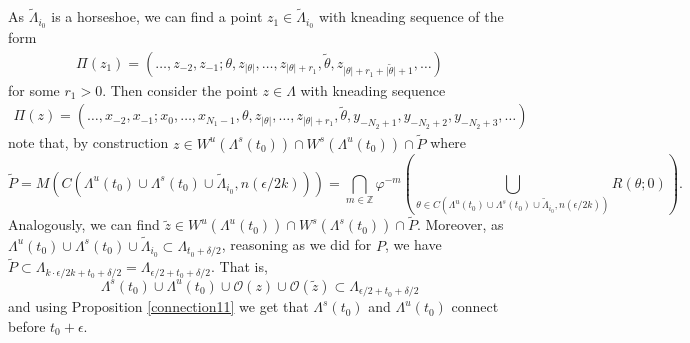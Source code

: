 \documentclass[12pt]{amsart}
\providecommand{\abs}[1]{\lvert#1\rvert}
\theoremstyle{plain} %
\theoremstyle{definition} %
\numberwithin{equation}{section}
\begin{document}
As $\tilde{\Lambda}_{i_0}$ is a horseshoe, we can find a point $z_1\in \tilde{\Lambda}_{i_0}$ with kneading sequence of the form
\begin{eqnarray*}
\Pi(z_1)=(\dots,z_{-2},z_{-1};\theta,z_{\abs{\theta}}, \dots ,z_{\abs{\theta}+r_1}, \tilde{\theta},z_{\abs{\theta}+r_1+\abs{\tilde{\theta}}+1}, \dots)
\end{eqnarray*}
for some $r_1>0$. Then consider the point $z\in \Lambda$ with kneading sequence 
\begin{eqnarray*}
\Pi(z)= (\dots,x_{-2},x_{-1}; x_0, \dots, x_{N_1-1},\theta, 
z_{\abs{\theta}}, \dots ,z_{\abs{\theta}+r_1}, \tilde{\theta}, y_{-N_2+1},y_{-N_2+2},y_{-N_2+3},\dots)
\end{eqnarray*}
note that, by construction $z\in W^u(\Lambda ^s(t_0))\cap W^s(\Lambda ^u(t_0))\cap \tilde{P}$ where 
$$\tilde{P}=M(C(\Lambda ^u(t_0) \cup \Lambda ^s(t_0) \cup \tilde{\Lambda}_{i_0},n(\epsilon/2k)))=\bigcap \limits_{m \in \mathbb{Z}} \varphi ^{-m}(\bigcup \limits_{\theta\in C(\Lambda ^u(t_0) \cup \Lambda ^s(t_0) \cup \tilde{\Lambda}_{i_0},n(\epsilon/2k))}  R(\theta;0)).$$  
Analogously, we can find $\tilde{z}\in W^u(\Lambda ^u(t_0))\cap W^s(\Lambda ^s(t_0))\cap \tilde{P}$. 
Moreover, as $\Lambda ^u(t_0) \cup \Lambda ^s(t_0) \cup \tilde{\Lambda}_{i_0} \subset \Lambda_{t_0+\delta/2}$, reasoning as we did for $P$, we have $\tilde{P}\subset \Lambda_{k\cdot\epsilon/2k+t_0+\delta/2}=\Lambda_{\epsilon/2+t_0+\delta/2}.$ That is,
$$\Lambda ^s(t_0) \cup \Lambda ^u(t_0) \cup \mathcal{O}(z) \cup \mathcal{O}(\tilde{z}) \subset \Lambda_{\epsilon/2+t_0+\delta/2}$$
and using Proposition \ref{connection11} we get that $\Lambda^s(t_0)$ and $ \Lambda^u(t_0)$ connect before $t_0+\epsilon$.
\end{document}
